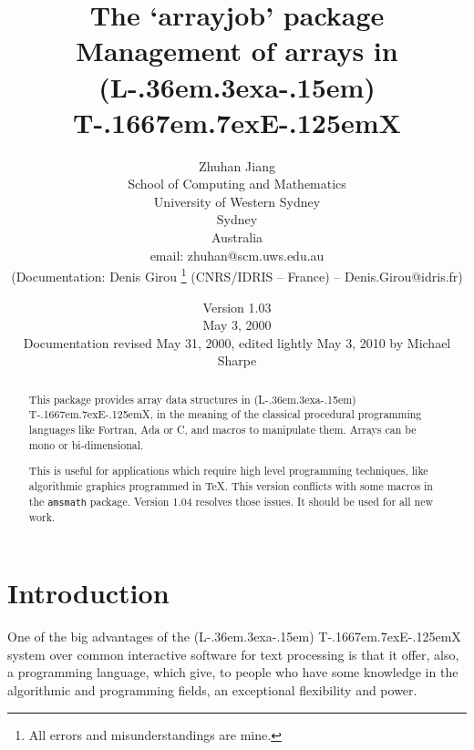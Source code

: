\documentclass{article}
\newcommand{\AllTeX}{%
{\rm(L\kern-.36em\raise.3ex\hbox{\sc a}\kern-.15em)%
T\kern-.1667em\lower.7ex\hbox{E}\kern-.125emX}}
\newcommand{\ArrayJobPackage}{`\textsf{arrayjob}'}
\begin{document}
\title{The \ArrayJobPackage{} package\\Management of arrays in \AllTeX}
\author{Zhuhan Jiang\\School of Computing and Mathematics\\
        University of Western Sydney\\Sydney\\Australia\\
        {\footnotesize email: zhuhan@scm.uws.edu.au}\\[5mm]
        {\footnotesize (Documentation: Denis Girou%
                       \footnote{All errors and misunderstandings are mine.}
                       \hspace{1mm}(CNRS/IDRIS -- France) --
                       Denis.Girou@idris.fr)}}
\date{Version 1.03\\May 3, 2000\\
      {\small Documentation revised May 31, 2000, edited lightly May 3, 2010 by Michael Sharpe}}

\maketitle

\begin{abstract}
  This package provides array data structures in \AllTeX, in the meaning of
the classical procedural programming languages like Fortran, Ada or C, and
macros to manipulate them. Arrays can be mono or bi-dimensional.

  This is useful for applications which require high level programming
techniques, like algorithmic graphics programmed in \TeX. This version conflicts with some macros in the {\tt amsmath} package. Version 1.04 resolves those issues. It should be used for all new work.
\end{abstract}

\tableofcontents

\section{Introduction}

  One of the big advantages of the \AllTeX{} system over common interactive
software for text processing is that it offer, also, a programming language,
which give, to people who have some knowledge in the algorithmic and
programming fields, an exceptional flexibility and power.
\end{document}
